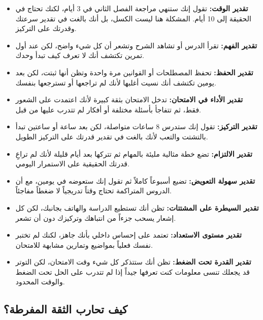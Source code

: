 \documentclass[12pt,a4paper]{book}
\begin{document}
\begin{itemize}
	\item \textbf{تقدير الوقت:} تقول إنك ستنهي مراجعة الفصل الثاني في 3 أيام، لكنك تحتاج في الحقيقة إلى 10 أيام. المشكلة هنا ليست الكسل، بل أنك بالغت في تقدير سرعتك وقدرتك على التركيز.
	
	\item \textbf{تقدير الفهم:} تقرأ الدرس أو تشاهد الشرح وتشعر أن كل شيء واضح، لكن عند أول تمرين تكتشف أنك لا تعرف كيف تبدأ وحدك.
	
	\item \textbf{تقدير الحفظ:} تحفظ المصطلحات أو القوانين مرة واحدة وتظن أنها ثبتت، لكن بعد يومين تكتشف أنك نسيت أغلبها لأنك لم تراجعها أو تسترجعها بنفسك.
	
	\item \textbf{تقدير الأداء في الامتحان:} تدخل الامتحان بثقة كبيرة لأنك اعتمدت على الشعور فقط، ثم تتفاجأ بأسئلة مختلفة أو أفكار لم تتدرب عليها من قبل.
	
	\item \textbf{تقدير التركيز:} تقول إنك ستدرس 8 ساعات متواصلة، لكن بعد ساعة أو ساعتين تبدأ بالتشتت والتعب لأنك بالغت في تقدير قدرتك على التركيز الطويل.
	
	\item \textbf{تقدير الالتزام:} تضع خطة مثالية مليئة بالمهام ثم تتركها بعد أيام قليلة لأنك لم تراعِ قدرتك الحقيقية على الاستمرار اليومي.
	
	\item \textbf{تقدير سهولة التعويض:} تضيع أسبوعاً كاملاً ثم تقول إنك ستعوضه في يومين، مع أن الدروس المتراكمة تحتاج وقتاً تدريجياً لا ضغطاً مفاجئاً.
	
	\item \textbf{تقدير السيطرة على المشتتات:} تظن أنك تستطيع الدراسة والهاتف بجانبك، لكن كل إشعار يسحب جزءاً من انتباهك وتركيزك دون أن تشعر.
	
	\item \textbf{تقدير مستوى الاستعداد:} تعتمد على إحساس داخلي بأنك جاهز، لكنك لم تختبر نفسك فعلياً بمواضيع وتمارين مشابهة للامتحان.
	
	\item \textbf{تقدير القدرة تحت الضغط:} تظن أنك ستتذكر كل شيء وقت الامتحان، لكن التوتر قد يجعلك تنسى معلومات كنت تعرفها جيداً إذا لم تتدرب على الحل تحت الضغط والوقت المحدود.
\end{itemize}

	\subsection{كيف تحارب الثقة المفرطة؟}
	
\end{document}
